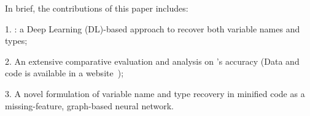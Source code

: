 In brief, the contributions of this paper includes:

1. {\bf {\tool}}: a Deep Learning (DL)-based approach to recover both
variable names and types;

2. An extensive comparative evaluation and analysis on {\tool}'s
accuracy (Data and code is available in a
website~\cite{deminify-website});

3. A novel formulation of variable name and type recovery in
minified code as a missing-feature, graph-based neural network.
